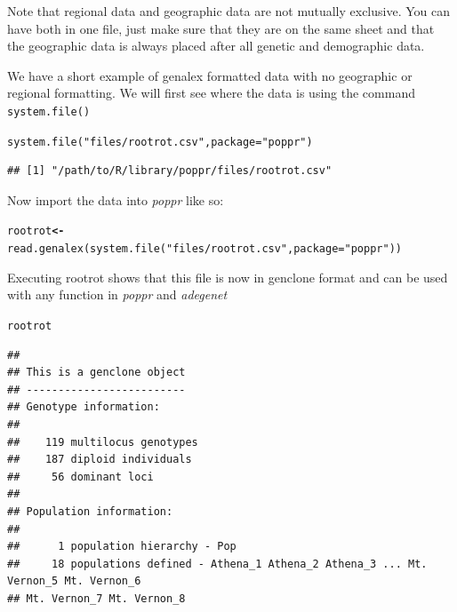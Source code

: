 \documentclass[letterpaper]{article}\usepackage[]{graphicx}\usepackage[]{color}
\makeatletter
\newcommand{\hlstr}[1]{\textcolor[rgb]{0.651,0.522,0}{#1}}%
\newcommand{\hlstd}[1]{\textcolor[rgb]{0,0,0}{#1}}%
\newcommand{\hlkwb}[1]{\textcolor[rgb]{0.502,0.502,0.753}{\textbf{#1}}}%
\newcommand{\hlkwc}[1]{\textcolor[rgb]{0,0.502,0.753}{#1}}%
\newcommand{\hlkwd}[1]{\textcolor[rgb]{0,0.267,0.4}{#1}}%
\newenvironment{kframe}{%
 \def\at@end@of@kframe{}%
 \ifinner\ifhmode%
  \def\at@end@of@kframe{\end{minipage}}%
  \begin{minipage}{\columnwidth}%
 \fi\fi%
 \def\FrameCommand##1{\hskip\@totalleftmargin \hskip-\fboxsep
 \colorbox{shadecolor}{##1}\hskip-\fboxsep
     \hskip-\linewidth \hskip-\@totalleftmargin \hskip\columnwidth}%
 \MakeFramed {\advance\hsize-\width
   \@totalleftmargin\z@ \linewidth\hsize
   \@setminipage}}%
 {\par\unskip\endMakeFramed%
 \at@end@of@kframe}
\newenvironment{knitrout}{}{} %
\newcommand{\poppr}{\textit{poppr}}
\newcommand{\adegenet}{\textit{adegenet}}
\makeatother
\begin{document}
Note that regional data and geographic data are not mutually exclusive. You can have both in one file, just make sure that they are on the same sheet and that the geographic data is always placed after all genetic and demographic data.

We have a short example of genalex formatted data with no geographic or regional formatting. We will first see where the data is using the command \texttt{system.file()}
\begin{knitrout}\footnotesize
{}\color{fgcolor}\begin{kframe}
\begin{alltt}
\hlkwd{system.file}\hlstd{(}\hlstr{"files/rootrot.csv"}\hlstd{,} \hlkwc{package} \hlstd{=} \hlstr{"poppr"}\hlstd{)}
\end{alltt}
\end{kframe}
\end{knitrout}

\begin{knitrout}\footnotesize
{}\color{fgcolor}\begin{kframe}
\begin{verbatim}
## [1] "/path/to/R/library/poppr/files/rootrot.csv"
\end{verbatim}
\end{kframe}
\end{knitrout}

Now import the data into \poppr{} like so:
\begin{knitrout}\footnotesize
{}\color{fgcolor}\begin{kframe}
\begin{alltt}
\hlstd{rootrot} \hlkwb{<-} \hlkwd{read.genalex}\hlstd{(}\hlkwd{system.file}\hlstd{(}\hlstr{"files/rootrot.csv"}\hlstd{,} \hlkwc{package} \hlstd{=} \hlstr{"poppr"}\hlstd{))}
\end{alltt}
\end{kframe}
\end{knitrout}

Executing rootrot shows that this file is now in genclone format and can be used
with any function in \poppr{} and \adegenet{}
\begin{knitrout}\footnotesize
{}\color{fgcolor}\begin{kframe}
\begin{alltt}
\hlstd{rootrot}
\end{alltt}
\begin{verbatim}
## 
## This is a genclone object
## -------------------------
## Genotype information:
## 
##    119 multilocus genotypes
##    187 diploid individuals
##     56 dominant loci
## 
## Population information:
## 
##      1 population hierarchy - Pop
##     18 populations defined - Athena_1 Athena_2 Athena_3 ... Mt. Vernon_5 Mt. Vernon_6 
## Mt. Vernon_7 Mt. Vernon_8
\end{verbatim}
\end{kframe}
\end{knitrout}
\end{document}
